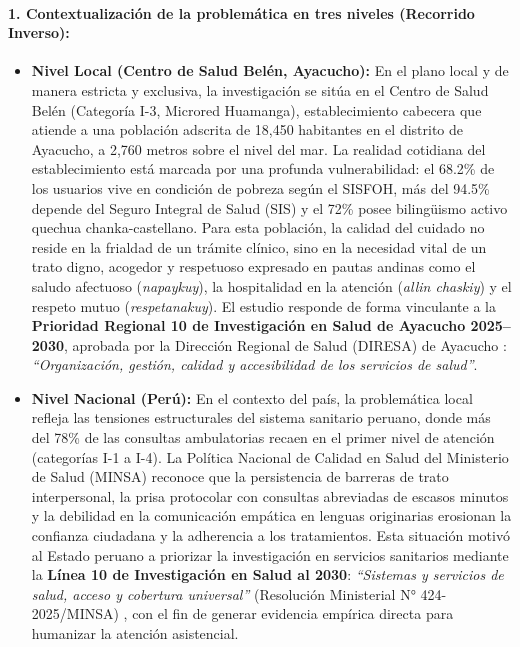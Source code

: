 \paragraph{1. Contextualización de la problemática en tres niveles (Recorrido Inverso):}
\begin{itemize}
    \item \textbf{Nivel Local (Centro de Salud Belén, Ayacucho):} En el plano local y de manera estricta y exclusiva, la investigación se sitúa en el Centro de Salud Belén (Categoría I-3, Microred Huamanga), establecimiento cabecera que atiende a una población adscrita de 18,450 habitantes en el distrito de Ayacucho, a 2,760 metros sobre el nivel del mar. La realidad cotidiana del establecimiento está marcada por una profunda vulnerabilidad: el 68.2\% de los usuarios vive en condición de pobreza según el SISFOH, más del 94.5\% depende del Seguro Integral de Salud (SIS) y el 72\% posee bilingüismo activo quechua chanka-castellano. Para esta población, la calidad del cuidado no reside en la frialdad de un trámite clínico, sino en la necesidad vital de un trato digno, acogedor y respetuoso expresado en pautas andinas como el saludo afectuoso (\textit{napaykuy}), la hospitalidad en la atención (\textit{allin chaskiy}) y el respeto mutuo (\textit{respetanakuy}). El estudio responde de forma vinculante a la \textbf{Prioridad Regional 10 de Investigación en Salud de Ayacucho 2025--2030}, aprobada por la Dirección Regional de Salud (DIRESA) de Ayacucho \cite{diresa2025}: \textit{``Organización, gestión, calidad y accesibilidad de los servicios de salud''}.
    
    \item \textbf{Nivel Nacional (Perú):} En el contexto del país, la problemática local refleja las tensiones estructurales del sistema sanitario peruano, donde más del 78\% de las consultas ambulatorias recaen en el primer nivel de atención (categorías I-1 a I-4). La Política Nacional de Calidad en Salud del Ministerio de Salud (MINSA) \cite{minsacalidad2021} reconoce que la persistencia de barreras de trato interpersonal, la prisa protocolar con consultas abreviadas de escasos minutos y la debilidad en la comunicación empática en lenguas originarias erosionan la confianza ciudadana y la adherencia a los tratamientos. Esta situación motivó al Estado peruano a priorizar la investigación en servicios sanitarios mediante la \textbf{Línea 10 de Investigación en Salud al 2030}: \textit{``Sistemas y servicios de salud, acceso y cobertura universal''} (Resolución Ministerial N° 424-2025/MINSA) \cite{minsainv2025}, con el fin de generar evidencia empírica directa para humanizar la atención asistencial.
    

\end{itemize}
